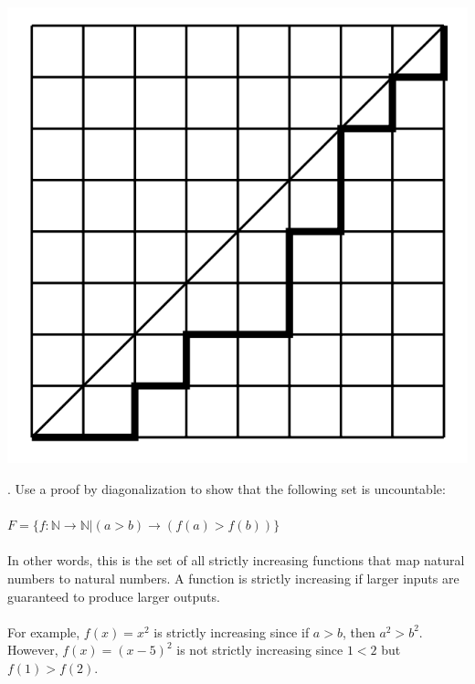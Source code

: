 \documentclass[12pt]{article}
\newcounter{quesnum}
\newcommand{\question}[2][??]{
\begin{list}{\labelitemi}{\leftmargin=2em}
\item [\arabic{quesnum}.] {} {#2}
\end{list}
\addtocounter{quesnum}{1}
}
\begin{document}
\includegraphics[scale=0.4]{img/lattice}

\vspace{12pt}

\question[3]{
Use a proof by diagonalization to show that the following set is uncountable:\\
\\
$F=\{ f:\mathbb{N} \rightarrow \mathbb{N} | (a>b) \rightarrow (f(a) > f(b)) \}$
\\
\\
In other words, this is the set of all strictly increasing functions that map natural numbers to natural numbers. A function is strictly increasing if larger inputs are guaranteed to produce larger outputs.\\
\\
For example, $f(x)=x^2$ is strictly increasing since if $a>b$, then $a^2>b^2$. However, $f(x)=(x-5)^2$ is not strictly increasing since $1<2$ but $f(1) > f(2)$.
}

\vspace{12pt}
\end{document}
